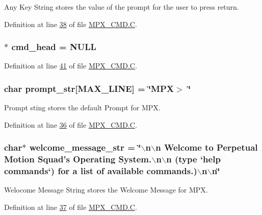 Any Key String stores the value of the prompt for the user to press return. 



Definition at line \hyperlink{_m_p_x___c_m_d_8_c_source_l00038}{38} of file \hyperlink{_m_p_x___c_m_d_8_c_source}{MPX\_\-CMD.C}.

\hypertarget{_m_p_x___c_m_d_8_c_af2d59668915a0a985c5301d887031811}{
\subsubsection[{cmd\_\-head}]{$\ast$ {\bf cmd\_\-head} = NULL}}
\label{_m_p_x___c_m_d_8_c_af2d59668915a0a985c5301d887031811}


Definition at line \hyperlink{_m_p_x___c_m_d_8_c_source_l00041}{41} of file \hyperlink{_m_p_x___c_m_d_8_c_source}{MPX\_\-CMD.C}.

\hypertarget{_m_p_x___c_m_d_8_c_a4d455760d7d89fa6a1c1559f7b6acdf7}{
\subsubsection[{prompt\_\-str}]{\setlength{\rightskip}{0pt plus 5cm}char {\bf prompt\_\-str}\mbox{[}MAX\_\-LINE\mbox{]} = \char`\"{}MPX$>$ \char`\"{}}}
\label{_m_p_x___c_m_d_8_c_a4d455760d7d89fa6a1c1559f7b6acdf7}


Prompt sting stores the default Prompt for MPX. 



Definition at line \hyperlink{_m_p_x___c_m_d_8_c_source_l00036}{36} of file \hyperlink{_m_p_x___c_m_d_8_c_source}{MPX\_\-CMD.C}.

\hypertarget{_m_p_x___c_m_d_8_c_a9f8c83d01b06ce3619ac78c395f9cdd1}{
\subsubsection[{welcome\_\-message\_\-str}]{\setlength{\rightskip}{0pt plus 5cm}char$\ast$ {\bf welcome\_\-message\_\-str} = \char`\"{}$\backslash$n$\backslash$n Welcome to Perpetual Motion Squad's Operating System.$\backslash$n$\backslash$n (type `help commands`) for a list of available commands.)$\backslash$n$\backslash$n\char`\"{}}}
\label{_m_p_x___c_m_d_8_c_a9f8c83d01b06ce3619ac78c395f9cdd1}


Welocome Message String stores the Welcome Message for MPX. 



Definition at line \hyperlink{_m_p_x___c_m_d_8_c_source_l00037}{37} of file \hyperlink{_m_p_x___c_m_d_8_c_source}{MPX\_\-CMD.C}.

